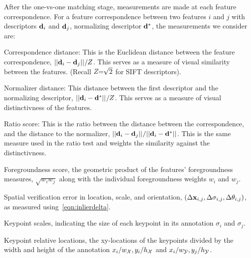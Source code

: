 After the one-vs-one matching stage, measurements are made at each feature
  correspondence.
For a feature correspondence between two features $i$ and $j$ with descriptors
  $\mathbf{d}_i$ and $\mathbf{d}_j$, normalizing descriptor $\mathbf{d}^{*}$, the measurements
  we consider are:
\begin{itemln}

    \item Correspondence distance:
        This is the Euclidean distance between the feature correspondence,
        $||\mathbf{d}_i - \mathbf{d}_j||_{} / Z$. This serves as a measure of visual
        similarity between the features. (Recall $Z\mkern-6mu=\mkern-6mu\sqrt{2}$ for SIFT
        descriptors).

    \item Normalizer distance:
        This distance between the first descriptor and the normalizing descriptor,
        $||\mathbf{d}_i - \mathbf{d}^{*}||_{} / Z$.
        This serves as a measure of visual distinctivness of the features.

    \item Ratio score:
        This is the ratio between the distance between the correspondence, and 
        the distance to the normalizer, %
        $||\mathbf{d}_i - \mathbf{d}_j||_{} / ||\mathbf{d}_i - \mathbf{d}^{*}||_{}$. This is the
        same measure used in the ratio test and weights the similarity against
        the distinctivness.

    \item Foregroundness score, the geometric product of the
        features' foregroundness measures, $\sqrt{w_i w_j}$ along with the
        individual foregroundness weights $w_i$ and $w_j$.
        
    \item Spatial verification error in location, scale, and orientation,
        $( %
        \Delta \pt_{i, j}, %
        \Delta \scale_{i, j}, %
        \Delta \ori_{i, j})$, as measured using~\cref{eqn:inlierdelta}.

    \item Keypoint scales, indicating the size of each keypoint in its
        annotation $\sigma_i$ and $\sigma_j$.

    \item Keypoint relative locations, the xy-locations of the keypoints
        divided by the width and height of the annotation 
         $x_i / w_{\mathcal{X}}, y_i / h_{\mathcal{X}}$ and
         $x_i / w_{\mathcal{Y}}, y_j / h_{\mathcal{Y}}$.
\end{itemln}

